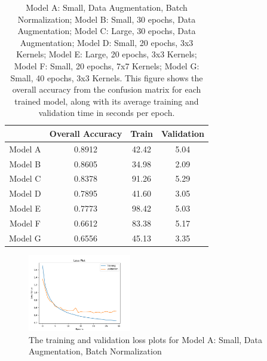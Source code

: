 \documentclass[11pt,a4paper]{article}
\begin{document}

 \begin{table}
    \centering
    \begin{tabular}{ |c|c|c|c| } 
     \hline
      & Overall Accuracy & Train & Validation \\
     \hline
     Model A & 0.8912 & 42.42 & 5.04 \\ 
     \hline
     Model B & 0.8605 & 34.98 & 2.09 \\ 
     \hline
     Model C & 0.8378 & 91.26 & 5.29 \\ 
     \hline
     Model D & 0.7895 & 41.60 & 3.05 \\ 
     \hline
     Model E & 0.7773 & 98.42 & 5.03 \\ 
     \hline
     Model F & 0.6612 & 83.38 & 5.17 \\ 
     \hline
     Model G & 0.6556 & 45.13 & 3.35 \\ 
     \hline
    
    \end{tabular}
    \caption{Model A: Small, Data Augmentation, Batch Normalization; Model B: Small, 30 epochs, Data Augmentation; Model C: Large, 30 epochs, Data Augmentation;
    Model D: Small, 20 epochs, 3x3 Kernels; Model E: Large, 20 epochs, 3x3 Kernels; Model F: Small, 20 epochs, 7x7 Kernels;
    Model G: Small, 40 epochs, 3x3 Kernels. This figure shows the overall accuracy from the confusion matrix 
    for each trained model, along with its average training and validation time in seconds per epoch.}
    \label{tab:table1}
\end{table}

\begin{figure}
  \centering
  \includegraphics[width=0.40\textwidth]{figures/plots.png}
  \caption{The training and validation loss plots for Model A: Small, Data Augmentation, Batch Normalization}
  \label{fig:plots}
\end{figure}
\end{document}
